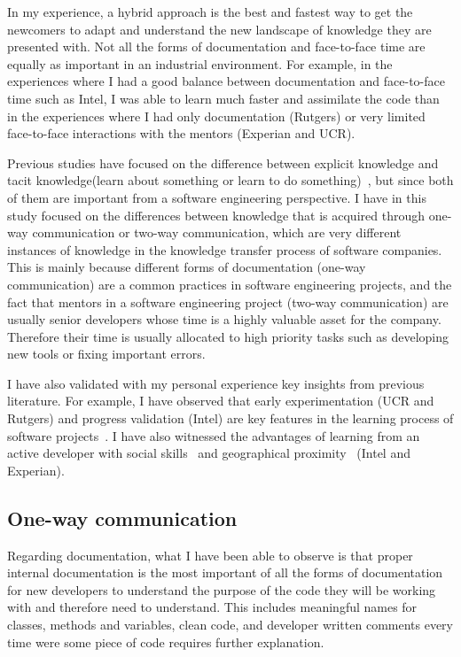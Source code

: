 \documentclass[12pt, letterpaper]{article}
\begin{document}
In my experience, a hybrid approach is the best and fastest way to get the newcomers to adapt and understand
the new landscape of knowledge they are presented with. Not all the forms of documentation and face-to-face time
are equally as important in an industrial environment. For example, in the experiences where I had a good balance between documentation and face-to-face time
such as Intel, I was able to learn much faster and assimilate the code than in the experiences where
I had only documentation (Rutgers) or very limited face-to-face interactions with the mentors (Experian and 
UCR). 

Previous studies have focused on the difference between explicit knowledge and tacit knowledge(learn about 
something or learn to do something)~\cite{cook99}, but since both of them are important from a software
engineering perspective. I have in this study focused on the differences between knowledge that is 
acquired through one-way communication or two-way communication, which are very different instances of knowledge
in the knowledge transfer process of software companies. This is mainly because different forms of 
documentation (one-way communication) are a common practices in software engineering projects, 
and the fact that mentors in a software engineering project (two-way communication) are usually senior developers 
whose time is a highly valuable asset for the company. Therefore their time is usually allocated to high priority tasks such as developing new tools or fixing important errors.

I have also validated with my personal experience key insights from previous literature. 
For example, I have observed that early experimentation (UCR and Rutgers) and progress validation (Intel) are key features
in the learning process of software projects~\cite{Dagenais10}. I have also witnessed the advantages of 
learning from an active developer with social skills~\cite{Steinmacher12}
and geographical proximity~\cite{Whitworth06} (Intel and Experian). 

\subsection{One-way communication}
Regarding documentation, what I have been able to observe is that proper internal documentation is the most 
important of all the forms of documentation for new developers to understand the purpose of the code they will
be working with and therefore need 
to understand. This includes meaningful names for classes, methods and variables, clean code, and developer written
comments every time were some piece of code requires further explanation.
\end{document}
